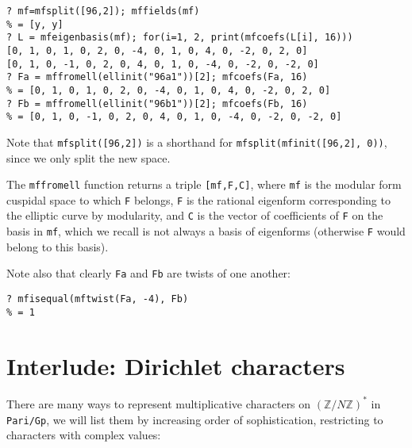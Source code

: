 \documentclass[11pt]{article}
\newcommand{\Z}{{\mathbb Z}}
\def\kbd#1{{\tt #1}}
\begin{document}
\begin{verbatim}
? mf=mfsplit([96,2]); mffields(mf)
% = [y, y]
? L = mfeigenbasis(mf); for(i=1, 2, print(mfcoefs(L[i], 16)))
[0, 1, 0, 1, 0, 2, 0, -4, 0, 1, 0, 4, 0, -2, 0, 2, 0]
[0, 1, 0, -1, 0, 2, 0, 4, 0, 1, 0, -4, 0, -2, 0, -2, 0]
? Fa = mffromell(ellinit("96a1"))[2]; mfcoefs(Fa, 16)
% = [0, 1, 0, 1, 0, 2, 0, -4, 0, 1, 0, 4, 0, -2, 0, 2, 0]
? Fb = mffromell(ellinit("96b1"))[2]; mfcoefs(Fb, 16)
% = [0, 1, 0, -1, 0, 2, 0, 4, 0, 1, 0, -4, 0, -2, 0, -2, 0]
\end{verbatim}
Note that \kbd{mfsplit([96,2])} is a shorthand for
\kbd{mfsplit(mfinit([96,2], 0))}, since we only split the new space.

The \kbd{mffromell} function returns a triple \kbd{[mf,F,C]},
where \kbd{mf} is the modular form cuspidal space to which \kbd{F} belongs,
\kbd{F} is the rational eigenform corresponding to the elliptic curve by
modularity, and \kbd{C} is the vector of coefficients of \kbd{F} on the
basis in \kbd{mf}, which we recall is not always a basis of eigenforms
(otherwise \kbd{F} would belong to this basis).

Note also that clearly \kbd{Fa} and \kbd{Fb} are twists of one another:

\begin{verbatim}
? mfisequal(mftwist(Fa, -4), Fb)
% = 1
\end{verbatim}

\section{Interlude: Dirichlet characters}

There are many ways to represent multiplicative characters on $(\Z/N\Z)^*$ in
\kbd{Pari/Gp}, we will list them by increasing order of sophistication,
restricting to characters with complex values:
\end{document}
